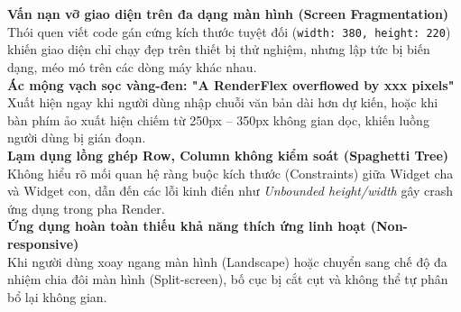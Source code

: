 \documentclass[aspectratio=169, 10pt]{beamer}
\newcommand{\SlideHeader}[2]{%
  \noindent{\textcolor{AccentOrange}{\textbf{\footnotesize #1}}}\\[0.08cm]
  \noindent{\Large \textbf{\textcolor{NavyTitle}{#2}}}\\[0.22cm]
}
\begin{document}
\begin{frame}
  \SlideHeader{ĐẶT VẤN ĐỀ}{Hiện Trạng \& Thách Thức Khi Xử Lý Bố Cục Không Gian}

  \textbf{Vấn nạn vỡ giao diện trên đa dạng màn hình (Screen Fragmentation)}\\
  {\small Thói quen viết code gán cứng kích thước tuyệt đối (\texttt{width: 380, height: 220}) khiến giao diện chỉ chạy đẹp trên thiết bị thử nghiệm, nhưng lập tức bị biến dạng, méo mó trên các dòng máy khác nhau.}\\[0.22cm]

  \textbf{Ác mộng vạch sọc vàng-đen: "A RenderFlex overflowed by xxx pixels"}\\
  {\small Xuất hiện ngay khi người dùng nhập chuỗi văn bản dài hơn dự kiến, hoặc khi bàn phím ảo xuất hiện chiếm từ 250px -- 350px không gian dọc, khiến luồng người dùng bị gián đoạn.}\\[0.22cm]

  \textbf{Lạm dụng lồng ghép Row, Column không kiểm soát (Spaghetti Tree)}\\
  {\small Không hiểu rõ mối quan hệ ràng buộc kích thước (Constraints) giữa Widget cha và Widget con, dẫn đến các lỗi kinh điển như \textit{Unbounded height/width} gây crash ứng dụng trong pha Render.}\\[0.22cm]

  \textbf{Ứng dụng hoàn toàn thiếu khả năng thích ứng linh hoạt (Non-responsive)}\\
  {\small Khi người dùng xoay ngang màn hình (Landscape) hoặc chuyển sang chế độ đa nhiệm chia đôi màn hình (Split-screen), bố cục bị cắt cụt và không thể tự phân bổ lại không gian.}
\end{frame}
\end{document}
